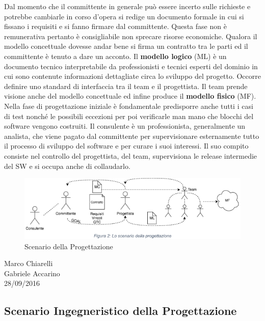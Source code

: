 Dal momento che il committente in generale può essere incerto sulle richieste e potrebbe cambiarle in corso d’opera si redige un documento formale in cui si fissano i requisiti e si fanno firmare dal committente. Questa fase non è remunerativa pertanto è consigliabile non sprecare risorse economiche. Qualora il modello concettuale dovesse andar bene si firma un contratto tra le parti ed il committente è tenuto a dare un acconto. Il \textbf{modello logico} (ML) è un documento tecnico interpretabile da professionisti e tecnici esperti del dominio in cui sono contenute informazioni dettagliate circa lo sviluppo del progetto. Occorre definire uno standard di interfaccia tra il team e il progettista. Il team prende visione anche del modello concettuale ed infine produce il \textbf{modello fisico} (MF). Nella fase di progettazione iniziale è fondamentale predisporre anche tutti i casi di test nonché le possibili eccezioni per poi verificarle man mano che blocchi del software vengono costruiti. Il consulente è un professionista, generalmente un analista, che viene pagato dal committente per supervisionare esternamente tutto il processo di sviluppo del software e per curare i suoi interessi. Il suo compito consiste nel controllo del progettista, del team, supervisiona le release intermedie del SW e si occupa anche di collaudarlo. 

\begin{center}
\begin{figure}[H]
\centering
\includegraphics[scale=0.8]{figures/mdlng.png}
\caption{Scenario della Progettazione} 
\end{figure}
\end{center}

\begin{flushright}Marco Chiarelli\\Gabriele Accarino\\28/09/2016\end{flushright}

\subsection{Scenario Ingegneristico della Progettazione}

